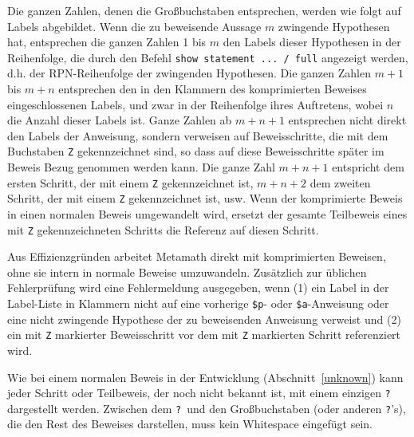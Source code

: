 Die ganzen Zahlen, denen die Großbuchstaben entsprechen, werden wie folgt auf Labels abgebildet.  Wenn die zu beweisende Aussage $m$ zwingende Hypothesen hat, entsprechen die ganzen Zahlen 1 bis $m$ den Labels dieser Hypothesen in der Reihenfolge, die durch den Befehl \texttt{show statement ... / full} angezeigt werden, d.h. der RPN-Reihenfolge der zwingenden Hypothesen.  Die ganzen Zahlen $m+1$ bis $m+n$ entsprechen den in den Klammern des komprimierten Beweises eingeschlossenen Labels, und zwar in der Reihenfolge ihres Auftretens, wobei $n$ die Anzahl dieser Labels ist.  Ganze Zahlen ab $m+n+1$ entsprechen nicht direkt den Labels der Anweisung, sondern verweisen auf Beweisschritte, die mit dem Buchstaben \texttt{Z} gekennzeichnet sind, so dass auf diese Beweisschritte später im Beweis Bezug genommen werden kann.  Die ganze Zahl $m+n+1$ entspricht dem ersten Schritt, der mit einem \texttt{Z} gekennzeichnet ist, $m+n+2$ dem zweiten Schritt, der mit einem \texttt{Z} gekennzeichnet ist, usw.  Wenn der komprimierte Beweis in einen normalen Beweis umgewandelt wird, ersetzt der gesamte Teilbeweis eines mit \texttt{Z} gekennzeichneten Schritts die Referenz auf diesen Schritt.

Aus Effizienzgründen arbeitet Metamath direkt mit komprimierten Beweisen, ohne sie intern in normale Beweise umzuwandeln.  Zusätzlich zur üblichen Fehlerprüfung wird eine Fehlermeldung ausgegeben, wenn (1) ein Label in der Label-Liste in Klammern nicht auf eine vorherige \texttt{\$p}- oder \texttt{\$a}-Anweisung oder eine nicht zwingende Hypothese der zu beweisenden Anweisung verweist und (2) ein mit \texttt{Z} markierter Beweisschritt vor dem mit \texttt{Z} markierten Schritt referenziert wird.

Wie bei einem normalen Beweis in der Entwicklung (Abschnitt~\ref{unknown}) kann jeder Schritt oder Teilbeweis, der noch nicht bekannt ist, mit einem einzigen \texttt{?} dargestellt werden. Zwischen dem \texttt{?}\ und den Großbuchstaben (oder anderen \texttt{?}'s), die den Rest des Beweises darstellen, muss kein Whitespace eingefügt sein.

